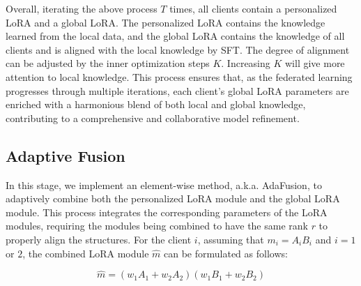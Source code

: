 \documentclass[sigconf]{acmart}
\begin{document}
\par
Overall, iterating the above process $T$ times, all clients contain a personalized LoRA and a global LoRA. The personalized LoRA contains the knowledge learned from the local data, and the global LoRA contains the knowledge of all clients and is aligned with the local knowledge by SFT. The degree of alignment can be adjusted by the inner optimization steps $K$. Increasing $K$ will give more attention to local knowledge. This process ensures that, as the federated learning progresses through multiple iterations, each client's global LoRA parameters are enriched with a harmonious blend of both local and global knowledge, contributing to a comprehensive and collaborative model refinement.

\subsection{Adaptive Fusion}
In this stage, we implement an element-wise method, a.k.a. AdaFusion, to adaptively combine both the personalized LoRA module and the global LoRA module. This process integrates the corresponding parameters of the LoRA modules, requiring the modules being combined to have the same rank $r$ to properly align the structures. For the client $i$, assuming that $m_{i} = A_i B_i$ and $i=1$ or $2$, the combined LoRA module $\hat{m}$ can be formulated as follows:

\begin{equation}
    \hat{m} = (w_{1}A_{1} + w_{2}A_{2}) (w_{1}B_{1} + w_{2}B_{2})
\end{equation}
\end{document}
